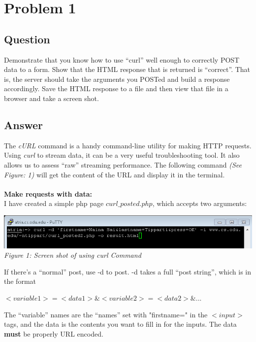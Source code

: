 \section{Problem 1}

\subsection{Question}
\vspace*{10pt}
Demonstrate that you know how to use \enquote{curl} well enough to
correctly POST data to a form.  Show that the HTML response that
is returned is \enquote{correct}.  That is, the server should take the
arguments you POSTed and build a response accordingly.  Save the
HTML response to a file and then view that file in a browser and
take a screen shot.
\vspace*{5mm}
\subsection{Answer}
\vspace{1mm}
The \textit{cURL} command is a handy command-line utility for making HTTP requests. Using \textit{curl} to stream data, it can be a very useful troubleshooting tool. It also allows us to assess \enquote{raw} streaming performance. The following command \textit{(See Figure: 1)}  will get the content of the URL and display it in the terminal. 
\\
\\
\textbf{Make requests with data:} 
\\
I have created a simple php page $curl\_posted.php$, which accepts two arguments:
\vspace*{1mm}
\begin{center}
	\includegraphics[scale=.75]{Q1/fig1.png}\\
	\textit{Figure 1: Screen shot of using curl Command}
\end{center}
\vspace*{5mm}
If there's a \enquote{normal} post, use -d to post. 
-d takes a full \enquote{post string}, which is in the format\\
\centerline{$<variable1>=<data1>\&<variable2>=<data2>\&...$}
The \enquote{variable} names are the \enquote{names} set with "firstname=" in the $<input>$ tags, and the data is the contents you want to fill in for the inputs. The data \textbf{must} be properly URL encoded. 
